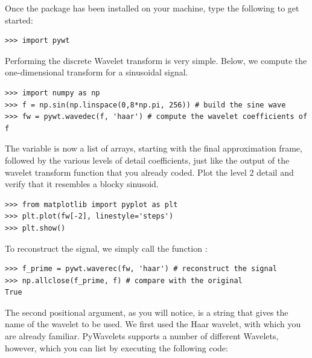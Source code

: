 Once the package has been installed on your machine, type the following to get started:

\begin{lstlisting}
>>> import pywt
\end{lstlisting}

Performing the discrete Wavelet transform is very simple.
Below, we compute the one-dimensional transform for a sinusoidal signal.

\begin{lstlisting}
>>> import numpy as np
>>> f = np.sin(np.linspace(0,8*np.pi, 256)) # build the sine wave
>>> fw = pywt.wavedec(f, 'haar') # compute the wavelet coefficients of f
\end{lstlisting}

The variable  is now a list of arrays, starting with the final approximation
frame, followed by the various levels of detail coefficients, just like the output
of the wavelet transform function that you already coded.
Plot the level 2 detail and verify that it resembles a blocky sinusoid.

\begin{lstlisting}
>>> from matplotlib import pyplot as plt
>>> plt.plot(fw[-2], linestyle='steps')
>>> plt.show()
\end{lstlisting}

To reconstruct the signal, we simply call the function :

\begin{lstlisting}
>>> f_prime = pywt.waverec(fw, 'haar') # reconstruct the signal
>>> np.allclose(f_prime, f) # compare with the original
True
\end{lstlisting}

The second positional argument, as you will notice, is a string that gives the name of the wavelet to be used.
We first used the Haar wavelet, with which you are already familiar.
PyWavelets supports a number of different Wavelets, however, which you can list by executing the following code:

